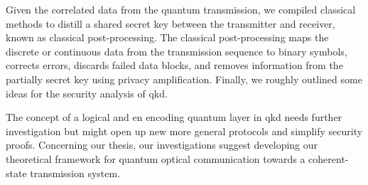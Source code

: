 Given the correlated data from the quantum transmission, we compiled classical methods to distill a shared secret key between the transmitter and receiver, known as classical post-processing. 
The classical post-processing maps the discrete or continuous data from the transmission sequence to binary symbols, corrects errors, discards failed data blocks, and removes information from the partially secret key using privacy amplification.
Finally, we roughly outlined some ideas for the security analysis of \gls{qkd}.

The concept of a logical and en encoding quantum layer in \gls{qkd} needs further investigation but might open up new more general protocols and simplify security proofs.
Concerning our thesis, our investigations suggest developing our theoretical framework for quantum optical communication towards a coherent-state transmission system.
